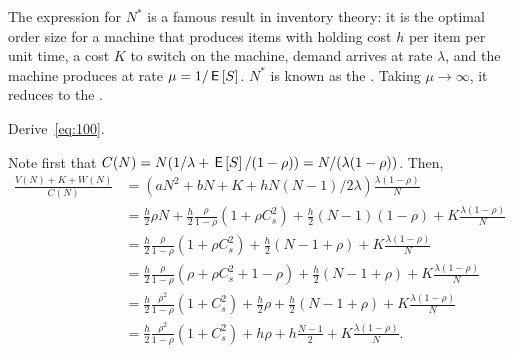 \begin{remark}
  The expression for $N^*$ is a famous result in inventory theory: it is the optimal order size for a machine that produces items with holding cost $h$ per item per unit time, a cost $K$ to switch on the machine, demand arrives at rate $\lambda$, and the machine produces at rate $\mu=1/\,\mathsf{E}\left[S\right]$.
  $N^*$ is known as the .
  Taking $\mu\to\infty$, it reduces to the .
\end{remark}

\begin{exercise}
Derive~\cref{eq:100}.
\begin{solution}
  Note first that $C(N) = N(1/\lambda + \,\mathsf{E}\left[S\right] / (1-\rho)) = N/(\lambda(1-\rho))$. Then,
  \begin{align*}
    \frac{V(N) + K + W(N)}{C(N)}
    &= \left(aN^2 + bN + K + h N(N-1)/2 \lambda\right) \frac{\lambda(1-\rho)}N \\
    &= \frac h 2 \rho N  + \frac h 2 \frac \rho{1-\rho} (1+\rho C_s^2) + \frac h 2 (N-1)(1-\rho) + K \frac{\lambda(1-\rho)}N \\
    &= \frac h 2 \frac \rho{1-\rho} (1+\rho C_s^2) + \frac h 2 (N-1 + \rho) + K \frac{\lambda(1-\rho)}N \\
    &= \frac h 2 \frac \rho{1-\rho} (\rho + \rho C_s^2 + 1 - \rho) + \frac h 2 (N-1 + \rho) + K \frac{\lambda(1-\rho)}N \\
    &= \frac h 2 \frac{\rho^2}{1-\rho} (1+ C_s^2) +\frac h 2 \rho + \frac h 2 (N-1 + \rho) + K \frac{\lambda(1-\rho)}N \\
    &= \frac h 2 \frac{\rho^2}{1-\rho} (1+ C_s^2) + h \rho + h \frac{N-1}2 + K \frac{\lambda(1-\rho)}N.
  \end{align*}
\end{solution}
\end{exercise}





